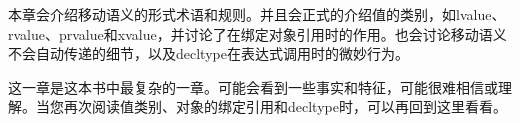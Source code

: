 本章会介绍移动语义的形式术语和规则。并且会正式的介绍值的类别，如lvalue、rvalue、prvalue和xvalue，并讨论了在绑定对象引用时的作用。也会讨论移动语义不会自动传递的细节，以及decltype在表达式调用时的微妙行为。\par

这一章是这本书中最复杂的一章。可能会看到一些事实和特征，可能很难相信或理解。当您再次阅读值类别、对象的绑定引用和decltype时，可以再回到这里看看。\par